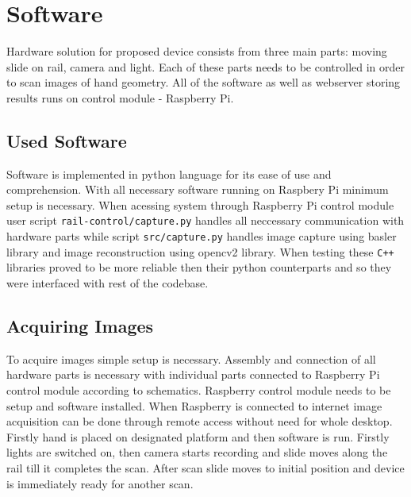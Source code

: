 \section{Software}
Hardware solution for proposed device consists from three main parts: moving slide on rail, camera and light.
Each of these parts needs to be controlled in order to scan images of hand geometry.
All of the software as well as webserver storing results runs on control module - Raspberry Pi.

\label{sec:sw}
\subsection{Used Software}
Software is implemented in python language for its ease of use and comprehension. With all necessary software running
on Raspbery Pi minimum setup is necessary.
When acessing system through Raspberry Pi control module user script \texttt{rail-control/capture.py} handles all
neccessary communication with hardware parts while script \texttt{src/capture.py} handles image capture using
basler library and image reconstruction using opencv2 library. When testing these \texttt{C++} libraries proved to be more
reliable then their python counterparts and so they were interfaced with rest of the codebase.

\subsection{Acquiring Images}
To acquire images simple setup is necessary. Assembly and connection of all hardware parts is necessary with individual
parts connected to Raspberry Pi control module according to schematics. Raspberry control module needs to be setup and
software installed.
When Raspberry is connected to internet image acquisition can be done through remote access without need for whole desktop.
Firstly hand is placed on designated platform and then software is run. Firstly lights are switched on, then camera starts
recording and slide moves along the rail till it completes the scan. After scan slide moves to initial position and device
is immediately ready for another scan.


